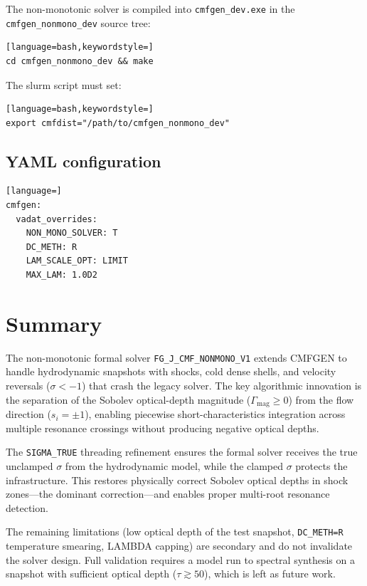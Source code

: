 \documentclass[11pt,a4paper]{article}
\begin{document}
The non-monotonic solver is compiled into \texttt{cmfgen\_dev.exe} in
the \texttt{cmfgen\_nonmono\_dev} source tree:
\begin{lstlisting}[language=bash,keywordstyle=]
cd cmfgen_nonmono_dev && make
\end{lstlisting}
The slurm script must set:
\begin{lstlisting}[language=bash,keywordstyle=]
export cmfdist="/path/to/cmfgen_nonmono_dev"
\end{lstlisting}

\subsection{YAML configuration}

\begin{lstlisting}[language=]
cmfgen:
  vadat_overrides:
    NON_MONO_SOLVER: T
    DC_METH: R
    LAM_SCALE_OPT: LIMIT
    MAX_LAM: 1.0D2
\end{lstlisting}

\section{Summary}

The non-monotonic formal solver \texttt{FG\_J\_CMF\_NONMONO\_V1}
extends CMFGEN to handle hydrodynamic snapshots with shocks, cold dense
shells, and velocity reversals ($\sigma < -1$) that crash the legacy
solver.  The key algorithmic innovation is the separation of the Sobolev
optical-depth magnitude ($\Gamma_{\mathrm{mag}} \geq 0$) from the flow
direction ($s_i = \pm 1$), enabling piecewise short-characteristics
integration across multiple resonance crossings without producing
negative optical depths.

The \texttt{SIGMA\_TRUE} threading refinement ensures the formal solver
receives the true unclamped $\sigma$ from the hydrodynamic model, while
the clamped $\sigma$ protects the infrastructure.  This restores
physically correct Sobolev optical depths in shock zones---the dominant
correction---and enables proper multi-root resonance detection.

The remaining limitations (low optical depth of the test snapshot,
\texttt{DC\_METH=R} temperature smearing, LAMBDA capping) are secondary
and do not invalidate the solver design.  Full validation requires a
model run to spectral synthesis on a snapshot with sufficient optical
depth ($\tau \gtrsim 50$), which is left as future work.
\end{document}
